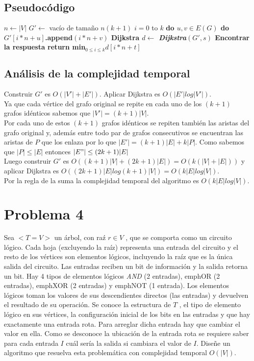 \documentclass[a4paper,10pt]{article}
\begin{document}
	\subsection{Pseudoc\'odigo}
\begin{algorithm}[h] 
	\begin{algorithmic}[1]
		\State $n \gets |V|$
		\State $G' \gets$ vac\'io de tama\~no $n(k+1)$		
		\For $i = 0$ to $k$ \bf{do}
			\For $u, v \in E(G)$ \bf{do}
				\State $G'[i*n+u]$.append$(i*n+v)$
			\EndFor
		\EndFor				\Comment \textnormal {Dijkstra}
		\State $d \gets$ \emph{Dijkstra}$(G', s)$	\Comment \textnormal{Encontrar la respuesta}
		\State \bf{return} min$_{0\leq i \leq k}d[i*n+t]$
		
	\end{algorithmic}
\end{algorithm}
	\subsection{Análisis de la complejidad temporal}
	Construir $G'$ es $O(|V'| + |E'|)$. Aplicar Dijkstra es $O(|E' |log|V'|)$.
	\\Ya que cada vértice del grafo original se repite en cada uno de los $(k+1)$ grafos idénticos sabemos que  $|V'| = (k + 1)|V|$.
	\\Por cada uno de estos $(k+1)$ grafos idénticos se repiten también las aristas del grafo original y, además entre todo par de grafos consecutivos se encuentran las aristas de $P$ que los enlaza por lo que $|E'|= (k + 1)|E|+ k|P|$. Como sabemos que $|P| \leq |E|$ entonces $|E"| \leq (2k+1)|E|$
	\\Luego construir $G'$ es $O((k+1)|V|+(2k+1)|E|)  =  O(k(|V|+|E|))$ y aplicar Dijkstra es	$O((2k + 1)|E|log(k + 1)|V|) = O(k|E|log|V|)$.
	\\Por la regla de la suma la complejidad temporal del algoritmo es $O(k|E|log|V|)$.
	
	
	\section{Problema 4}
	Sea $<T = V>$ un árbol, con ra\'z $r \in V$ , que se comporta como un circuito lógico. Cada hoja (excluyendo la ra\'iz) representa una entrada del circuito y el resto de los vértices son elementos lógicos, incluyendo la ra\'iz que es la única salida del circuito. Las entradas reciben un bit de información y la salida retorna un bit. Hay
	4 tipos de elementos lógicos \emph{AND} (2 entradas), emph{OR} (2 entradas), emph{XOR} (2 entradas) y emph{NOT} (1 entrada). Los elementos lógicos toman los valores de sus descendientes directos (las entradas) y devuelven el resultado de su operación. Se conoce la estructura de $T$ , el tipo de elemento lógico en sus vértices, la configuración inicial de los bits en las entradas y que hay exactamente una entrada rota. Para arreglar dicha entrada hay que cambiar el valor en ella. Como se desconoce la ubicación de la entrada rota se requiere saber para cada entrada $I$ cu\'al	ser\'ia la salida si cambiara el valor de $I$. Diseñe un algoritmo que resuelva esta problemática con complejidad temporal $O(|V |)$.
\end{document}
